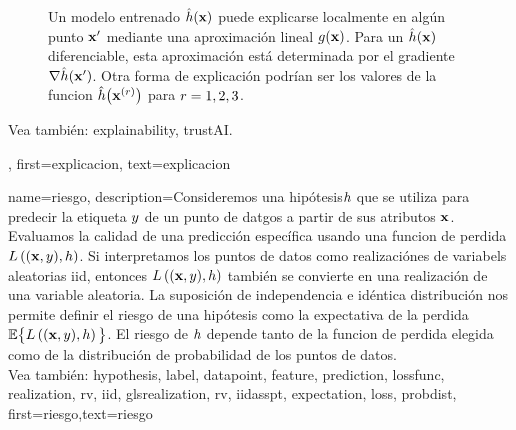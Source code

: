 {{\begin{figure}[H]
\begin{center}
	 \end{center}
	 \caption{Un modelo entrenado $\hat{h}({\bf x})$ puede explicarse 
	 localmente en algún punto ${\bf x}'$ mediante una aproximación lineal $g({\bf x})$. 
	 Para un $\hat{h}({\bf x})$ diferenciable, esta aproximación está 
	 determinada por el gradiente $\nabla \hat{h}({\bf x}')$. Otra 
	 forma de explicación podrían ser los valores de la funcion $\hat{h}\big({\bf x}^{(r)} \big)$ 
	 para $r=1,2,3$.
		\label{fig_explanation_dict}}
	 \end{figure} 
		Vea también: \gls{explainability}, \gls{trustAI}.},
	first={explicacion},
	text={explicacion} 
}

{name={riesgo},
	description={Consideremos una hipótesis$h$ que se utiliza para predecir la etiqueta 
		$y$ de un punto de datgos a partir de sus atributos ${\bf x}$. Evaluamos 
		la calidad de una predicción específica usando una funcion de perdida $L\left(({\bf x},y),h \right)$. 
		Si interpretamos los puntos de datos como realizaciónes de variabels aleatorias iid, 
		entonces $L\left(({\bf x},y),h \right)$ también se convierte en una realización
		de una variable aleatoria. La suposición de independencia e idéntica distribución nos permite definir el riesgo de una hipótesis
		como la expectativa de la perdida $\mathbb{E} \big\{L\left(({\bf x},y),h \right) \big\}$. 
		El riesgo de $h$ depende tanto de la funcion de perdida elegida como de la distribución de probabilidad de los puntos de datos.
		\\
		 Vea también: \gls{hypothesis}, \gls{label}, \gls{datapoint}, \gls{feature},  \gls{prediction}, \gls{lossfunc}, \gls{realization}, \gls{rv}, \gls{iid}, gls{realization}, \gls{rv}, \gls{iidasspt}, \gls{expectation}, \gls{loss}, \gls{probdist}},
	first={riesgo},text={riesgo} 
}


